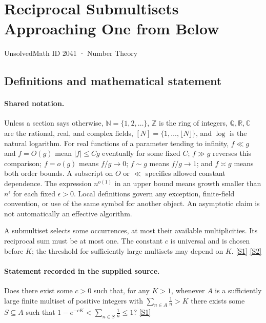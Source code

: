 \documentclass[11pt,a4paper]{article}
\newcommand{\N}{\mathbb{N}}
\newcommand{\Z}{\mathbb{Z}}
\newcommand{\Q}{\mathbb{Q}}
\newcommand{\R}{\mathbb{R}}
\newcommand{\C}{\mathbb{C}}
\newcommand{\sref}[2]{\hyperlink{source:#1:#2}{[S#2]}}
\begin{document}

\setcounter{section}{2040}

\section{Reciprocal Submultisets Approaching One from Below}\label{2041}

{\small\sffamily UnsolvedMath ID 2041 · Number Theory}

\subsection{Definitions and mathematical statement}

\paragraph{Shared notation.}Unless a section says otherwise, $\N=\{1,2,\ldots\}$,
$\Z$ is the ring of integers, $\Q,\R,\C$ are the rational, real, and complex
fields, $[N]=\{1,\ldots,\lfloor N\rfloor\}$, and $\log$ is the natural
logarithm. For real functions of a parameter tending to infinity,
$f\ll g$ and $f=O(g)$ mean $|f|\leq Cg$ eventually for some fixed $C$;
$f\gg g$ reverses this comparison; $f=o(g)$ means $f/g\to0$;
$f\sim g$ means $f/g\to1$; and $f\asymp g$ means both order bounds.
A subscript on $O$ or $\ll$ specifies allowed constant dependence.
The expression $n^{o(1)}$ in an upper bound means growth smaller than
$n^\epsilon$ for each fixed $\epsilon>0$. Local definitions govern any
exception, finite-field convention, or use of the same symbol for another
object. An asymptotic claim is not automatically an effective algorithm.



A submultiset selects some occurrences, at most their available multiplicities. Its reciprocal sum must be at most one. The constant $c$ is universal and is chosen before $K$; the threshold for sufficiently large multisets may depend on $K$. \sref{2041}{1} \sref{2041}{2}

\paragraph{Statement recorded in the supplied source.}
Does there exist some $c>0$ such that, for any $K>1$, whenever $A$ is a sufficiently large finite multiset of positive integers with $\sum_{n\in A}\frac{1}{n}>K$ there exists some $S\subseteq A$ such that $ 1-e^{-cK} < \sum_{n\in S}\frac{1}{n}\leq 1? $ \sref{2041}{1}
\end{document}
